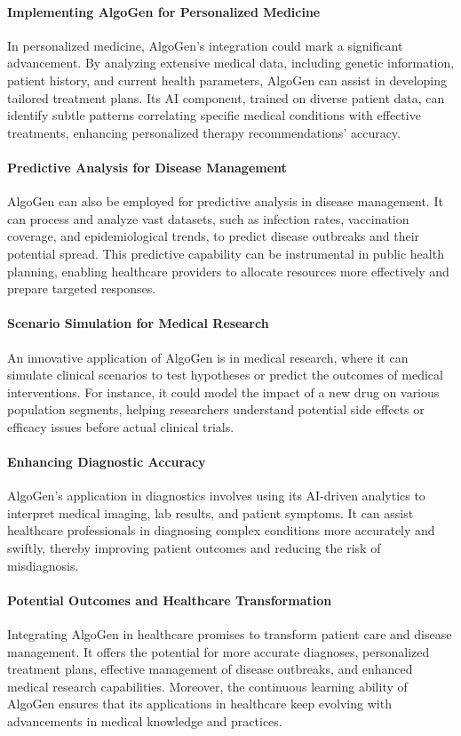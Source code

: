 \documentclass{article}
\begin{document}
\paragraph{Implementing AlgoGen for Personalized Medicine}
In personalized medicine, AlgoGen's integration could mark a significant advancement. By analyzing extensive medical data, including genetic information, patient history, and current health parameters, AlgoGen can assist in developing tailored treatment plans. Its AI component, trained on diverse patient data, can identify subtle patterns correlating specific medical conditions with effective treatments, enhancing personalized therapy recommendations' accuracy.

\paragraph{Predictive Analysis for Disease Management}
AlgoGen can also be employed for predictive analysis in disease management. It can process and analyze vast datasets, such as infection rates, vaccination coverage, and epidemiological trends, to predict disease outbreaks and their potential spread. This predictive capability can be instrumental in public health planning, enabling healthcare providers to allocate resources more effectively and prepare targeted responses.

\paragraph{Scenario Simulation for Medical Research}
An innovative application of AlgoGen is in medical research, where it can simulate clinical scenarios to test hypotheses or predict the outcomes of medical interventions. For instance, it could model the impact of a new drug on various population segments, helping researchers understand potential side effects or efficacy issues before actual clinical trials.

\paragraph{Enhancing Diagnostic Accuracy}
AlgoGen's application in diagnostics involves using its AI-driven analytics to interpret medical imaging, lab results, and patient symptoms. It can assist healthcare professionals in diagnosing complex conditions more accurately and swiftly, thereby improving patient outcomes and reducing the risk of misdiagnosis.

\paragraph{Potential Outcomes and Healthcare Transformation}
Integrating AlgoGen in healthcare promises to transform patient care and disease management. It offers the potential for more accurate diagnoses, personalized treatment plans, effective management of disease outbreaks, and enhanced medical research capabilities. Moreover, the continuous learning ability of AlgoGen ensures that its applications in healthcare keep evolving with advancements in medical knowledge and practices.
\end{document}
